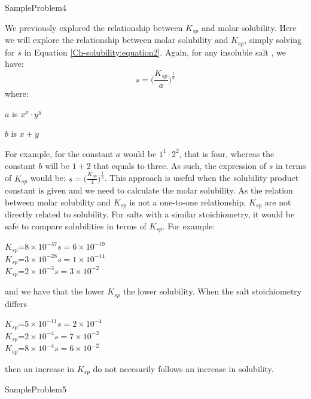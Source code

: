 \documentclass[main.tex]{subfiles}
\newcommand\chapterlabel{Ch-solubility}\setcounter{figurenewcounter}{0}\setcounter{tablenewcounter}{0}\setcounter{formulanewcounter}{0}
\begin{document}
\begin{description}
  {SampleProblem4}


\item[\docfilehook{Molar solubility in terms of $K_{sp}$: general formula}{}] We previously explored the relationship between $K_{sp}$ and molar solubility. Here we will explore the relationship between molar solubility and $K_{sp}$, simply solving for $s$ in Equation \ref{\chapterlabel:equation2}. Again, for any insoluble salt , we have:
\begin{equation}
\boxed{ s= \Big( \frac{K_{sp}}{a} \Big)^{\frac{1}{b}}  }\label{\chapterlabel:equation3}
\end{equation}
where:
\begin{where}
 \item $a$  is $x^x\cdot y^y$
 \item $b$  is $x+y$
\end{where}
For example, for  the constant $a$ would be $1^1\cdot 2^2$, that is four, whereas the constant $b$ will be $1+2$ that equals to three. As such, the expression of $s$ in terms of $K_{sp}$ would be: $s= \big( \frac{K_{sp}}{4} \big)^{\frac{1}{3}} $. This approach is useful when the solubility product constant is given and we need to calculate the molar solubility.
As the relation between molar solubility and $K_{sp}$ is not a one-to-one relationship, $K_{sp}$ are not directly related to solubility. For salts with a similar stoichiometry, it would be safe to compare solubilities in terms of $K_{sp}$. For example:
\begin{center}
	\hfill	$K_{sp}$=$8\times10^{-37}$\hfill$s=6\times10^{-19}$\\
	\hfill	$K_{sp}$=$3\times10^{-28}$\hfill$s=1\times10^{-14}$\\
	\hfill	$K_{sp}$=$2\times10^{-3}$\hfill$s=3\times10^{-2}$
\end{center}
and we have that the lower $K_{sp}$ the lower solubility. When the salt stoichiometry differs
\begin{center}
	\hfill	$K_{sp}$=$5\times10^{-11}$\hfill$s=2\times10^{-4}$\\
	\hfill	$K_{sp}$=$2\times10^{-4}$\hfill$s=7\times10^{-2}$\\
	\hfill	$K_{sp}$=$8\times10^{-4}$\hfill$s=6\times10^{-2}$\\
\end{center}
then an increase in $K_{sp}$ do not necesarily follows an increase in solubility.



  {SampleProblem5}


\end{description}
\end{document}
